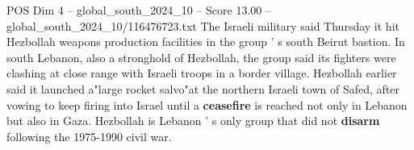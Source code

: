 \begin{textsample}{POS Dim 4 – global\_south\_2024\_10 – Score 13.00 – global\_south\_2024\_10/116476723.txt}
The Israeli military said Thursday it hit Hezbollah weapons production facilities in the group ' s south Beirut bastion.
In south Lebanon, also a stronghold of Hezbollah, the group said its fighters were clashing at close range with Israeli troops in a border village.
Hezbollah earlier said it launched a"large rocket salvo"at the northern Israeli town of Safed, after vowing to keep firing into Israel until a \textbf{ceasefire} is reached not only in Lebanon but also in Gaza.
Hezbollah is Lebanon ' s only group that did not \textbf{disarm} following the 1975-1990 civil war.

\end{textsample}
